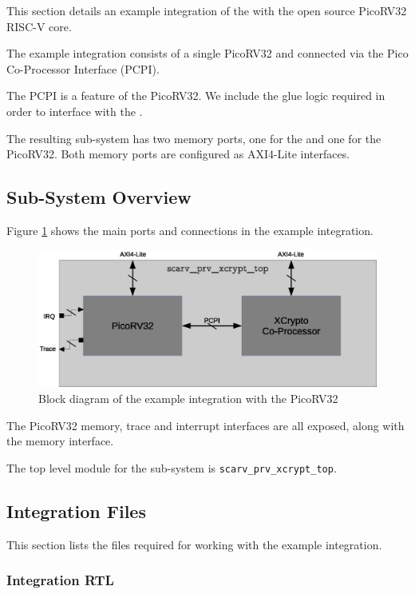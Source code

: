 
This section details an example integration of the \COP with
the open source PicoRV32 RISC-V core.

The example integration consists of a single PicoRV32 and \COP
connected via the Pico Co-Processor Interface (PCPI).

The PCPI is a feature of the PicoRV32.
We include the glue logic required in order to interface with the \COP.

The resulting sub-system has two memory ports, one for the \COP and one
for the PicoRV32.
Both memory ports are configured as AXI4-Lite interfaces.

\subsection{Sub-System Overview}

Figure \ref{fig:integration-block} shows the main ports and connections in
the example integration.

\begin{figure}[h]
\centering
\includegraphics[width=1.0\textwidth]{diagrams/integration-block-diagram.eps}
\caption{Block diagram of the example \COP integration with the PicoRV32}
\label{fig:integration-block}
\end{figure}

The PicoRV32 memory, trace and interrupt interfaces are all exposed, along
with the \COP memory interface.

The top level module for the sub-system is {\tt scarv\_prv\_xcrypt\_top}.


\subsection{Integration Files}

This section lists the files required for working with the example
integration.

\subsubsection{Integration RTL}

